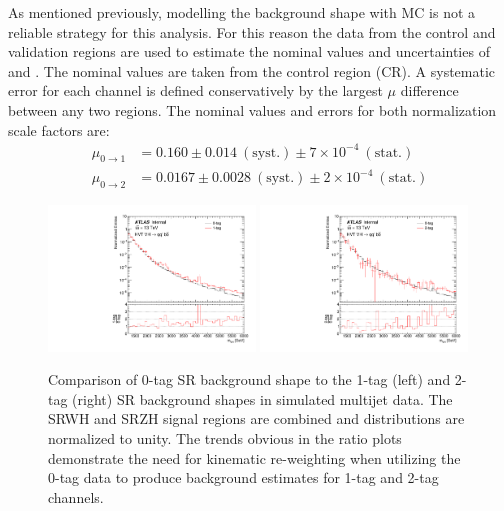 As mentioned previously, modelling the background shape with MC is not a reliable strategy for this analysis.
For this reason the data from the control and validation regions are used to estimate the nominal values and uncertainties of \muOne and \muTwo.
The nominal values are taken from the control region (CR).
A systematic error for each channel is defined conservatively by the largest $\mu$ difference between any two regions.
The nominal values and errors for both normalization scale factors are:
\begin{align}
    \mu_{0 \rightarrow 1} &= 0.160 \pm 0.014\ \mathrm{(syst.)} \pm 7 \times 10^{-4}\ \mathrm{(stat.)} \\
    \mu_{0 \rightarrow 2} &= 0.0167 \pm 0.0028\ \mathrm{(syst.)} \pm 2 \times 10^{-4}\ \mathrm{(stat.)}
\end{align}

\begin{figure}[htbp!]
\begin{center}
\includegraphics[width=0.49\textwidth]{VHqqbb_mVH_BTagRatio_0_to_1_MC.pdf}
\includegraphics[width=0.49\textwidth]{VHqqbb_mVH_BTagRatio_0_to_2_MC.pdf}
\end{center}
\caption{Comparison of 0-tag SR background shape to the 1-tag (left) and 2-tag (right) SR background shapes in simulated multijet data.
The SRWH and SRZH signal regions are combined and distributions are normalized to unity.
The trends obvious in the ratio plots demonstrate the need for kinematic re-weighting when utilizing the 0-tag data to produce background estimates for 1-tag and 2-tag channels.
}
\label{fig:bkg_0tag_comp}
\end{figure}

